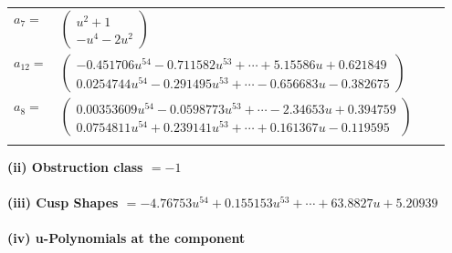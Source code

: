 \documentclass[1p]{elsarticle_modified}
\theoremstyle{definition}
\begin{document}
\begin{tabular}{m{7pt} m{180pt} m{7pt} m{180pt} }
\flushright $a_{7}=$&$\begin{pmatrix}u^2+1\\- u^4-2 u^2\end{pmatrix}$ \\
\flushright $a_{12}=$&$\begin{pmatrix}-0.451706 u^{54}-0.711582 u^{53}+\cdots+5.15586 u+0.621849\\0.0254744 u^{54}-0.291495 u^{53}+\cdots-0.656683 u-0.382675\end{pmatrix}$ \\
\flushright $a_{8}=$&$\begin{pmatrix}0.00353609 u^{54}-0.0598773 u^{53}+\cdots-2.34653 u+0.394759\\0.0754811 u^{54}+0.239141 u^{53}+\cdots+0.161367 u-0.119595\end{pmatrix}$\\&\end{tabular}
\flushleft \textbf{(ii) Obstruction class $= -1$}\\~\\
\flushleft \textbf{(iii) Cusp Shapes $= -4.76753 u^{54}+0.155153 u^{53}+\cdots+63.8827 u+5.20939$}\\~\\
\newpage\renewcommand{\arraystretch}{1}
\flushleft \textbf{(iv) u-Polynomials at the component}\newline \\
\end{document}
